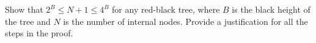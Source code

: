 Show that $2^{B} \leq  N+1 \leq  4^{B}$ for any red-black tree, where $B$
is the black height of the tree and $N$ is the number of internal
nodes.  Provide a justification for all the steps in the proof.

